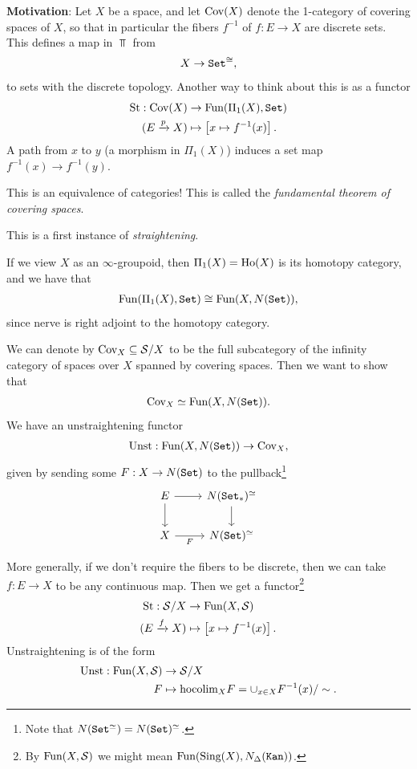 \documentclass[12pt]{amsart}
\theoremstyle{definition}
\providecommand{\St}{\text{St}}
\providecommand{\Unst}{\text{Unst}}
\begin{document}
\textbf{Motivation}: Let $X$ be a space, and let $\text{Cov}(X)$ denote the 1-category of covering spaces of $X$, so that in particular the fibers $f^{-1}$ of $f: E \to X$ are discrete sets. This defines a map in $\Top$ from
\begin{align*}
    X \to \texttt{Set}^{\cong},
\end{align*}
to sets with the discrete topology. Another way to think about this is as a functor
\begin{align*}
    \St:\Cov(X) &\to \Fun(\Pi_1(X), \Set) \\
    (E \xto{p} X) &\mapsto \left[ x \mapsto f^{-1}(x) \right].
\end{align*}
A path from $x$ to $y$ (a morphism in $\Pi_1(X)$) induces a set map $f^{-1}(x) \to f^{-1}(y)$.

This is an equivalence of categories! This is called the \textit{fundamental theorem of covering spaces}.

This is a first instance of \textit{straightening}.

If we view $X$ as an $\infty$-groupoid, then $\Pi_1(X) = \text{Ho}(X)$ is its homotopy category, and we have that
\begin{align*}
    \text{Fun}(\Pi_1(X),\texttt{Set}) \cong \text{Fun}(X,N(\texttt{Set})),
\end{align*}
since nerve is right adjoint to the homotopy category.

We can denote by $\text{Cov}_X \subseteq \mathcal{S}/X$ to be the full subcategory of the infinity category of spaces over $X$ spanned by covering spaces. Then we want to show that
\begin{align*}
    \text{Cov}_X \simeq \text{Fun}(X,N(\texttt{Set})).
\end{align*}
We have an unstraightening functor
\begin{align*}
    \Unst: \Fun(X,N(\Set)) \to \Cov_X,
\end{align*}
given by sending some $F: X \to N(\texttt{Set})$ to the pullback\footnote{Note that $N(\texttt{Set}^\simeq) = N(\texttt{Set})^\simeq$.}
\[ \begin{tikzcd}
    E\rar\dar & N(\Set_\ast)^\simeq\dar\\
    X\rar["F" below] & N(\Set)^\simeq
\end{tikzcd} \]

More generally, if we don't require the fibers to be discrete, then we can take $f: E \to X$ to be any continuous map. Then we get a functor\footnote{By $\text{Fun}(X,\mathcal{S})$ we might mean $\text{Fun}(\text{Sing}(X),N_\Delta(\texttt{Kan}))$.}
\begin{align*}
    \St:\mathcal{S}/X &\to \Fun(X,\mathcal{S}) \\
    (E \xto{f} X) &\mapsto \left[ x \mapsto f^{-1}(x) \right].
\end{align*}
Unstraightening is of the form
\begin{align*}
    \Unst: \Fun(X,\mathcal{S}) &\to \mathcal{S}/X \\
    F &\mapsto \hocolim_X F = \cup_{x\in X} F^{-1}(x) / \sim.
\end{align*}
\end{document}
